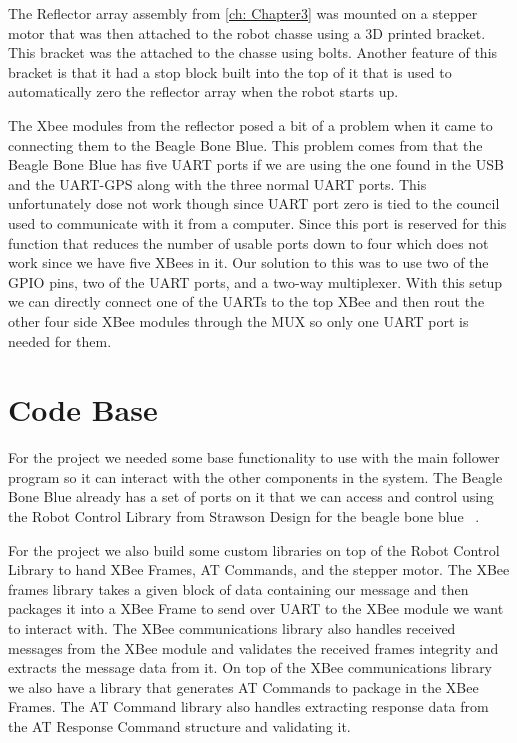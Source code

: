 \vspace*{12pt}
\noindent
The Reflector array assembly from \autoref{ch: Chapter3} was mounted on a stepper motor that was then attached to the robot chasse using a 3D printed bracket.  This bracket was the attached to the chasse using bolts.  Another feature of this bracket is that it had a stop block built into the top of it that is used to automatically zero the reflector array when the robot starts up.

\vspace*{12pt}
\noindent
The Xbee modules from the reflector posed a bit of a problem when it came to connecting them to the Beagle Bone Blue.  This problem comes from that the Beagle Bone Blue has five UART ports if we are using the one found in the USB and the UART-GPS along with the three normal UART ports.  This unfortunately dose not work though since UART port zero is tied to the council used to communicate with it from a computer.  Since this port is reserved for this function that reduces the number of usable ports down to four which does not work since we have five XBees in it.  Our solution to this was to use two of the GPIO pins, two of the UART ports, and a two-way multiplexer.  With this setup we can directly connect one of the UARTs to the top XBee and then rout the other four side XBee modules through the MUX so only one UART port is needed for them.


\section{Code Base}
\label{sec:Code Base}

For the project we needed some base functionality to use with the main follower program so it can interact with the other components in the system.  The Beagle Bone Blue already has a set of ports on it that we can access and control using the Robot Control Library from Strawson Design for the beagle bone blue ~\cite{Robot_Control_Library}.

\vspace*{12pt}
\noindent
For the project we also build some custom libraries on top of the Robot Control Library to hand XBee Frames, AT Commands, and the stepper motor.  The XBee frames library takes a given block of data containing our message and then packages it into a XBee Frame to send over UART to the XBee module we want to interact with.  The XBee communications library also handles received messages from the XBee module and validates the received frames integrity and extracts the message data from it.  On top of the XBee communications library we also have a library that generates AT Commands to package in the XBee Frames.  The AT Command library also handles extracting response data from the AT Response Command structure and validating it.

